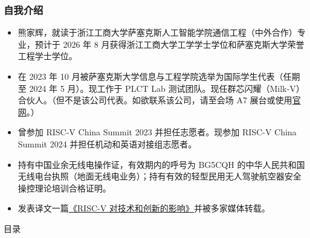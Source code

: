 \documentclass[xcolor=table,dvipsnames,svgnames,aspectratio=169]{ctexbeamer}
\begin{document}
\begin{frame}
  \frametitle{自我介绍}


  \begin{itemize}
    \item 熊家辉，就读于浙江工商大学萨塞克斯人工智能学院通信工程（中外合作）专业，预计于 2026 年 8 月获得浙江工商大学工学学士学位和萨塞克斯大学荣誉工程学士学位。
    \item 在 2023 年 10 月被萨塞克斯大学信息与工程学院选举为国际学生代表（任期至 2024 年 5 月）。现工作于 PLCT Lab 测试团队。现任群芯闪耀（Milk-V）合伙人。（但不是该公司代表。如欲联系该公司，请至会场 A7 展台或使用\href{https://milkv.io/}{官网}。）
    \item 曾参加 RISC-V China Summit 2023 并担任志愿者。现参加 RISC-V China Summit 2024 并担任机动和英语对接组志愿者。
    \item 持有中国业余无线电操作证，有效期内的呼号为 BG5CQH 的中华人民共和国无线电台执照（地面无线电业务）；持有有效的轻型民用无人驾驶航空器安全操控理论培训合格证明。
    \item 发表译文一篇\href{https://mp.weixin.qq.com/s/0oge4bSOYCZCAZGXtiGRKA}{《RISC-V 对技术和创新的影响》}并被多家媒体转载。
  \end{itemize}

\end{frame}

\begin{frame}{目录}
  \tableofcontents[hideallsubsections]	%
\end{frame}
\end{document}
